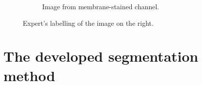 \documentclass[
  digital,     %
  oneside,     %
  nosansbold,  %
  nocolorbold, %
  lof,         %
  lot,         %
]{fithesis4}
\begin{document}
\begin{figure}
\begin{subfigure}[t]{0.4\textwidth}
        \caption{Image from membrane-stained channel.}
        \label{fig:label_membrane_channel}
    \end{subfigure}
    \hfill
    \caption{Expert's labelling of the image on the right.}
    \label{fig:labelling_example}
\end{figure}


\chapter{The developed segmentation method}

\end{document}
